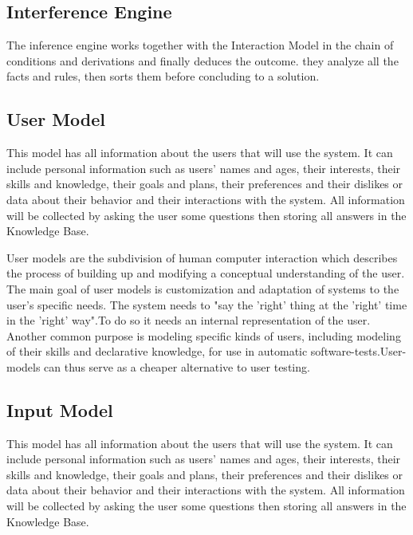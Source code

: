 \documentclass[12pt,a4paper]{article}
\begin{document}
\subsection{Interference Engine}
\par The inference engine works together with the Interaction
Model in the chain of conditions and derivations and finally
deduces the outcome. they analyze all the facts and rules, then
sorts them before concluding to a solution.

\subsection{User Model}
\par This model has all information about the users that will use
the system. It can include personal information such as users'
names and ages, their interests, their skills and knowledge,
their goals and plans, their preferences and their dislikes or data
about their behavior and their interactions with the system. All information will be collected by asking the user some questions
then storing all answers in the Knowledge Base.

\newpage
\par User models are the subdivision of human computer interaction which describes the process of building up and modifying a conceptual understanding of the user. The main goal of user models is customization and adaptation of systems to the user's specific needs. The system needs to "say the 'right' thing at the 'right' time in the 'right' way".To do so it needs an internal representation of the user. Another common purpose is modeling specific kinds of users, including modeling of their skills and declarative knowledge, for use in automatic software-tests.User-models can thus serve as a cheaper alternative to user testing.


\subsection{Input Model}
\par This model has all information about the users that will use
the system. It can include personal information such as users'
names and ages, their interests, their skills and knowledge,
their goals and plans, their preferences and their dislikes or data
about their behavior and their interactions with the system. All information will be collected by asking the user some questions
then storing all answers in the Knowledge Base.
\end{document}
